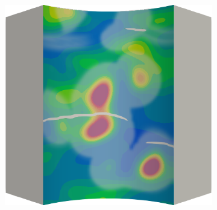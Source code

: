 \begin{figure}[!htbp]
\begin{subfigure}{0.19\textwidth}
  \end{subfigure}
  \hspace{0.06\textwidth}
  \begin{subfigure}{0.19\textwidth}
    \centering
    \includegraphics[width=\textwidth]{Chapter5/figures/spallation/ep.0027}
  \end{subfigure}
  

\end{figure}
